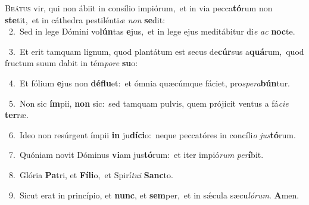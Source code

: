\lettrine{\initial\textcolor{\initialcolor}{B}}{eátus} vir, qui non ábiit in consílio impiórum,~\dagger et in via pecca\-\textbf{tó}\-rum non \textbf{ste}\-tit,~\star et in cáthedra pestilénti\textit{æ} \textit{non} \textbf{se}\-dit:\\
{\numbfont\textcolor{\numbcolor}{~2.}}~Sed in lege Dómini vo\-\textbf{lún}\-tas \textbf{e}\-jus,~\star et in lege ejus meditábitur di\textit{e} \textit{ac} \textbf{noc}\-te.\par
{\numbfont\textcolor{\numbcolor}{~3.}}~Et erit tamquam lignum, quod plantátum est secus de\-\textbf{cúr}\-sus a\-\textbf{quá}\-rum,~\star quod fructum suum dabit in tém\-\textit{po}\-\textit{re} \textbf{su}\-o:\par
{\numbfont\textcolor{\numbcolor}{~4.}}~Et fólium \textbf{e}\-jus non \textbf{dé}\-\textbf{flu}et:~\star et ómnia quæcúmque fáciet, pro\-\textit{spe}\-\textit{ra}\textbf{bún}tur.\par
{\numbfont\textcolor{\numbcolor}{~5.}}~Non sic \textbf{ím}\-pii, \textbf{non} sic:~\star sed tamquam pulvis, quem prójicit ventus a fá\-\textit{ci}\-\textit{e} \textbf{ter}\-ræ.\par
{\numbfont\textcolor{\numbcolor}{~6.}}~Ideo non resúrgent ímpii \textbf{in} ju\-\textbf{dí}\-\textbf{ci}o:~\star neque peccatóres in concíli\textit{o} \textit{jus}\-\textbf{tó}rum.\par
{\numbfont\textcolor{\numbcolor}{~7.}}~Quóniam novit Dóminus \textbf{vi}\-am jus\-\textbf{tó}\-rum:~\star et iter impió\textit{rum} \textit{per}\-\textbf{í}bit.\par
{\numbfont\textcolor{\numbcolor}{~8.}}~Glória \textbf{Pa}\-tri, et \textbf{Fí}\-\textbf{li}o,~\star et Spirí\-\textit{tu}\-\textit{i} \textbf{Sanc}\-to.\par
{\numbfont\textcolor{\numbcolor}{~9.}}~Sicut erat in princípio, et \textbf{nunc}\-, et \textbf{sem}\-per,~\star et in sǽcula sæcu\-\textit{ló}\-\textit{rum}. \textbf{A}\-men.\par
